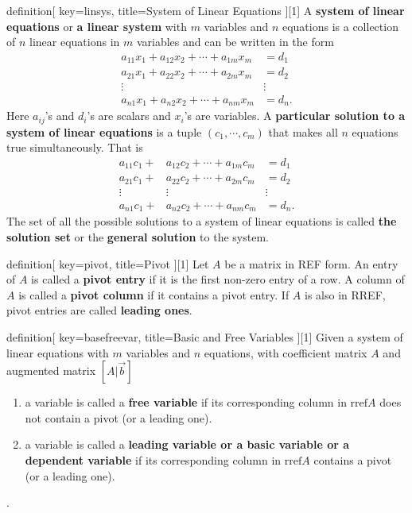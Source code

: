 \begin{SaveConcept}{definition}[
		key=linsys,
		title={System of Linear Equations}
	][1]
        A \textbf{system of linear equations} or \textbf{a linear system} with $m$ variables and $n$ equations is a collection of $n$ linear equations in $m$ variables and can be written in the form 
	\begin{eqnarray*}\label{system}
		a_{11}x_{1}+a_{12}x_{2}+\cdots+ a_{1m}x_{m}&=d_1\\\nonumber
		a_{21}x_{1}+a_{22}x_{2}+\cdots +a_{2m}x_{m}&=d_2\\\nonumber
		\vdots&\vdots\\\nonumber
		a_{n1}x_{1}+a_{n2}x_{2}+\cdots +a_{nm}x_{m}&=d_n.
	\end{eqnarray*}
	Here $a_{ij}$'s and $d_i$'s are scalars and $x_i$'s are variables. 
	A \textbf{ particular solution to a  system of linear equations} is a tuple $(c_1,\cdots,c_m)$ that makes all $n$ equations true simultaneously. That is 
	\begin{eqnarray*}
		a_{11}c_{1}+&a_{12}c_{2}+\cdots+ a_{1m}c_{m}&=d_1\\\nonumber
		a_{21}c_{1}+&a_{22}c_{2}+\cdots +a_{2m}c_{m}&=d_2\\\nonumber
		\vdots&\vdots&\vdots\\\nonumber
		a_{n1}c_{1}+&a_{n2}c_{2}+\cdots +a_{nm}c_{m}&=d_n.\nonumber
	\end{eqnarray*}
	The set of all the possible solutions to a system of linear equations is called \textbf{the solution set} or the \textbf{general solution} to the system.
\end{SaveConcept}


\begin{SaveConcept}{definition}[
		key=pivot,
		title={Pivot}
	][1]
        Let $A$  be a matrix in REF form. An entry of $A$ is called a \textbf{pivot entry} if it is the first non-zero entry of a row. A column of $A$ is called a \textbf{pivot column} if it contains a pivot entry.  If $A$ is also in RREF, pivot entries are called \textbf{leading ones}.
\end{SaveConcept}

\begin{SaveConcept}{definition}[
		key=basefreevar,
		title={Basic and Free Variables}
	][1]
	Given a system of linear equations with $m$ variables and $n$ equations, with coefficient matrix $A$ and augmented matrix $[A|\vec b]$
	\begin{enumerate}
		\item a variable is called a \textbf{free variable} if its corresponding column in $\mathrm{rref} A$ does not contain a pivot (or a leading one).
		\item a variable is called a \textbf{leading variable or a basic variable or a dependent variable} if its corresponding column in $\mathrm{rref} A$ contains a pivot (or a leading one).
	\end{enumerate}.
\end{SaveConcept}


